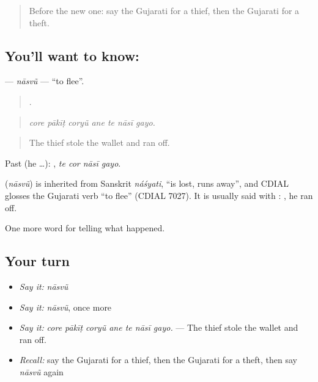 \label{lesson:GU-C285-nasvu}



\begin{quote}
Before the new one: say the Gujarati for a thief, then the Gujarati for a theft.
\end{quote}

\subsection*{You'll want to know: }
\textbf{} — \emph{nāsvũ} — \textquotedblleft{}to flee\textquotedblright{}.

\begin{quote}
      .
\end{quote}

\begin{quote}
\emph{core pākīṭ coryũ ane te nāsī gayo.}
\end{quote}

\begin{quote}
The thief stole the wallet and ran off.
\end{quote}

Past (he …):    , \emph{te cor nāsī gayo}.

\begin{cousinweb}
\textbf{} (\emph{nāsvũ}) is inherited from Sanskrit \emph{náśyati}, \textquotedblleft{}is lost, runs away\textquotedblright{}, and CDIAL glosses the Gujarati verb \textquotedblleft{}to flee\textquotedblright{} (CDIAL 7027). It is usually said with \textbf{}: \textbf{ }, he ran off.
\end{cousinweb}

\begin{grammarlens}[title={What you've built}]
One more word for telling what happened.
\end{grammarlens}

\subsection*{Your turn}
\begin{itemize}
\raggedright
  \item \emph{Say it:} \emph{nāsvũ}
  \item \emph{Say it:} \emph{nāsvũ}, once more
  \item \emph{Say it:} \emph{core pākīṭ coryũ ane te nāsī gayo.} — The thief stole the wallet and ran off.
  \item \emph{Recall:} say the Gujarati for a thief, then the Gujarati for a theft, then say \emph{nāsvũ} again
\end{itemize}

